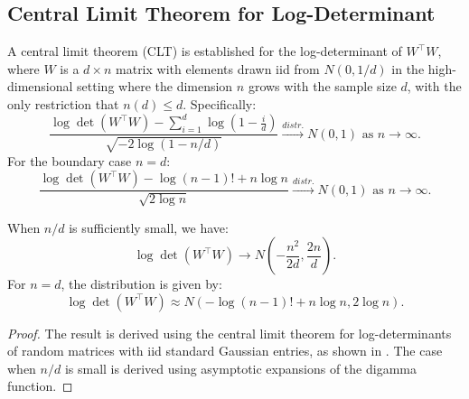 \subsection{Central Limit Theorem for Log-Determinant}

\begin{theorem}
A central limit theorem (CLT) is established for the log-determinant of \( W^\top W \), where \( W \) is a \( d \times n \) matrix with elements drawn iid from \( N(0, 1/d) \) in the high-dimensional setting where the dimension \( n \) grows with the sample size \( d \), with the only restriction that \( n(d) \leq d \). Specifically:
\begin{equation}
\frac{\log \det (W^\top W) - \sum_{i=1}^{d} \log \left(1 - \frac{i}{d}\right)}{\sqrt{-2\log(1-n/d)}} \xrightarrow{distr.} N(0,1) \text{ as } n \to \infty.
\end{equation}
For the boundary case \( n=d \):
\begin{equation}
\frac{\log \det (W^\top W) -\log(n-1)! + n \log n}{\sqrt{2\log n}} \xrightarrow{distr.} N(0,1) \text{ as } n \to \infty.
\end{equation}
\end{theorem}

\begin{remark}
When \( n/d \) is sufficiently small, we have:
\begin{equation}
\log\det(W^\top W) \to N\left(-\frac{n^2}{2d}, \frac{2n}{d}\right).
\end{equation}
For \( n=d \), the distribution is given by:
\begin{equation}
\log\det(W^\top W) \approx N\left(-\log(n-1)! + n \log n, 2\log n\right).
\end{equation}
\end{remark}

\begin{proof}
The result is derived using the central limit theorem for log-determinants of random matrices with iid standard Gaussian entries, as shown in \cite{hazra2019det}. The case when \( n/d \) is small is derived using asymptotic expansions of the digamma function.
\end{proof}
